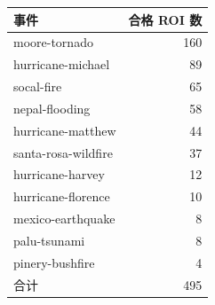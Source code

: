 \begin{tabular}{lr}
\hline
事件 & 合格 ROI 数 \\
\hline
moore-tornado & 160 \\
hurricane-michael & 89 \\
socal-fire & 65 \\
nepal-flooding & 58 \\
hurricane-matthew & 44 \\
santa-rosa-wildfire & 37 \\
hurricane-harvey & 12 \\
hurricane-florence & 10 \\
mexico-earthquake & 8 \\
palu-tsunami & 8 \\
pinery-bushfire & 4 \\\hline
合计 & 495 \\
\hline
\end{tabular}

